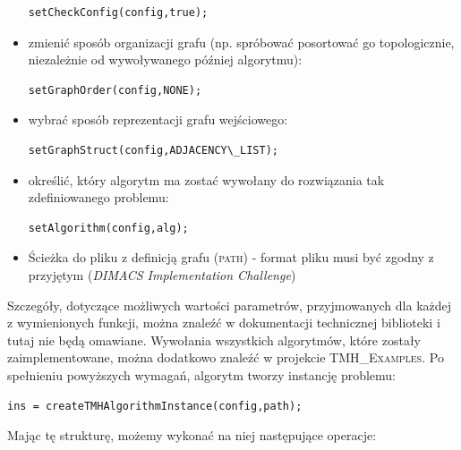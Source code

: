 \begin{itemize}
	\begin{lstlisting}[style=customc]
setCheckConfig(config,true);
	\end{lstlisting}
	\item zmienić sposób organizacji grafu (np. spróbować posortować go topologicznie, niezależnie od wywoływanego później algorytmu):
	\begin{lstlisting}[style=customc]
setGraphOrder(config,NONE);
	\end{lstlisting}
	\item wybrać sposób reprezentacji grafu wejściowego:
	\begin{lstlisting}[style=customc]
setGraphStruct(config,ADJACENCY\_LIST);
	\end{lstlisting}
	\item określić, który algorytm ma zostać wywołany do rozwiązania tak zdefiniowanego problemu:
	\begin{lstlisting}[style=customc]
setAlgorithm(config,alg);
	\end{lstlisting}
	\item Ścieżka do pliku z definicją grafu (\textsc{path}) - format pliku musi być zgodny z przyjętym (\textit{DIMACS Implementation Challenge})
\end{itemize}

Szczegóły, dotyczące możliwych wartości parametrów, przyjmowanych dla każdej z wymienionych funkcji, można znaleźć w dokumentacji technicznej biblioteki i tutaj nie będą omawiane. Wywołania wszystkich algorytmów, które zostały zaimplementowane, można dodatkowo znaleźć w projekcie \textsc{TMH\_Examples}. Po spełnieniu powyższych wymagań, algorytm tworzy instancję problemu:

\begin{lstlisting}[style=customc]
ins = createTMHAlgorithmInstance(config,path);
\end{lstlisting}

Mając tę strukturę, możemy wykonać na niej następujące operacje:

